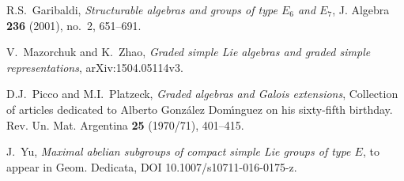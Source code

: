 \documentclass[a4paper,reqno]{amsart}
\theoremstyle{definition}
\numberwithin{theorem}{section}
\numberwithin{equation}{section}
\begin{document}
\begin{thebibliography}{ABFP08}
R.S.~Garibaldi, \emph{Structurable algebras and groups of type $E_6$ and $E_7$},
J. Algebra \textbf{236} (2001), no.~2, 651--691.

 V.~Mazorchuk and K.~Zhao, \emph{Graded simple Lie algebras and graded simple representations}, arXiv:1504.05114v3.

D.J.~Picco and M.I.~Platzeck, \emph{Graded algebras and Galois extensions}, 
Collection of articles dedicated to Alberto Gonz\'alez Dom\'{\i}nguez on his sixty-fifth birthday. 
Rev. Un. Mat. Argentina \textbf{25} (1970/71), 401--415. 

J.~Yu, \emph{Maximal abelian subgroups of compact simple Lie groups of type $E$}, to appear in Geom. Dedicata, DOI 10.1007/s10711-016-0175-z.

\end{thebibliography}
\end{document}
